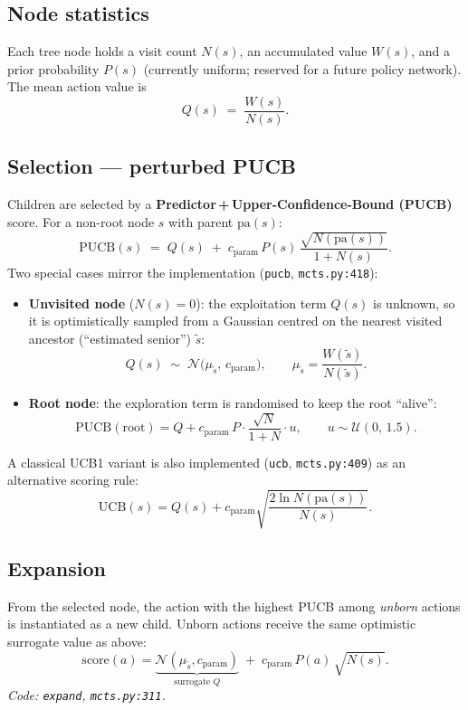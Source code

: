 \documentclass[11pt]{article}
\newcommand{\PUCB}{\mathrm{PUCB}}
\newcommand{\UCB}{\mathrm{UCB}}
\newcommand{\Norm}{\mathcal{N}}
\newcommand{\Uni}{\mathcal{U}}
\newcommand{\pa}{\mathrm{pa}}
\begin{document}
\subsection{Node statistics}
Each tree node holds a visit count $N(s)$, an accumulated value $W(s)$, and a prior
probability $P(s)$ (currently uniform; reserved for a future policy network). The mean
action value is
\begin{equation}
  Q(s) \;=\; \frac{W(s)}{N(s)}.
\end{equation}

\subsection{Selection --- perturbed PUCB}
Children are selected by a \textbf{Predictor\,+\,Upper-Confidence-Bound (PUCB)} score.
For a non-root node $s$ with parent $\pa(s)$:
\begin{equation}
  \PUCB(s) \;=\; Q(s) \;+\; c_{\text{param}}\, P(s)\,
  \frac{\sqrt{N(\pa(s))}}{1 + N(s)} .
\end{equation}
Two special cases mirror the implementation (\texttt{pucb}, \texttt{mcts.py:418}):
\begin{itemize}[leftmargin=*]
  \item \textbf{Unvisited node} ($N(s)=0$): the exploitation term $Q(s)$ is unknown, so
  it is optimistically sampled from a Gaussian centred on the nearest visited ancestor
  (``estimated senior'') $\tilde s$:
  \begin{equation}
    Q(s) \;\sim\; \Norm\!\big(\mu_{\tilde s},\, c_{\text{param}}\big),
    \qquad \mu_{\tilde s} = \frac{W(\tilde s)}{N(\tilde s)} .
  \end{equation}
  \item \textbf{Root node}: the exploration term is randomised to keep the root
  ``alive'':
  \begin{equation}
    \PUCB(\text{root}) = Q + c_{\text{param}}\,P\cdot
    \frac{\sqrt{N}}{1+N}\cdot u, \qquad u\sim \Uni(0,\,1.5).
  \end{equation}
\end{itemize}
A classical UCB1 variant is also implemented (\texttt{ucb}, \texttt{mcts.py:409}) as an
alternative scoring rule:
\begin{equation}
  \UCB(s) = Q(s) + c_{\text{param}}\sqrt{\frac{2\ln N(\pa(s))}{N(s)}} .
\end{equation}

\subsection{Expansion}
From the selected node, the action with the highest PUCB among \emph{unborn} actions is
instantiated as a new child. Unborn actions receive the same optimistic surrogate value
as above:
\begin{equation}
  \mathrm{score}(a) = \underbrace{\Norm(\mu_{\tilde s}, c_{\text{param}})}_{\text{surrogate } Q}
  \;+\; c_{\text{param}}\,P(a)\,\sqrt{N(s)} .
\end{equation}
\textit{Code: \texttt{expand}, \texttt{mcts.py:311}.}
\end{document}
